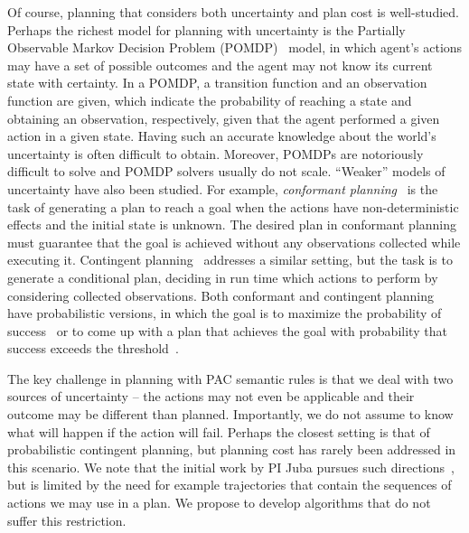 \documentclass[12pt]{article}
\newcommand{\note}[1]{\textbf{\textit{#1}}}
\begin{document}




Of course, planning that considers both uncertainty and plan cost is well-studied. Perhaps the richest model for planning with uncertainty is the Partially Observable Markov Decision Problem (POMDP)~\cite{cassandra1994acting}
model, in which agent's actions may have a set of possible outcomes and the agent may not know its current state with certainty. 
In a POMDP, a transition function and an observation function are given, which indicate the probability of reaching a state and obtaining an observation, respectively, given that the agent performed a given action in a given state. Having such an accurate knowledge about the world's uncertainty is often difficult to obtain. Moreover, POMDPs are notoriously difficult to solve and POMDP solvers usually do not scale. %
``Weaker'' models of uncertainty have also been studied. 
For example, {\em conformant planning}~\cite{hoffmann2006conformant,cimatti2004conformant,cimatti1999conformant} is the task of generating a plan to reach a goal when the actions have non-deterministic effects
and the initial state is unknown. The desired plan in conformant planning must guarantee that the goal is achieved without any observations collected while executing it. Contingent planning~\cite{hoffmann2005contingent,majercik2003contingent} addresses a similar setting, but the task is to generate a conditional plan, deciding in run time which actions to perform by considering collected observations. 
Both conformant and contingent planning have probabilistic versions,
in which the goal is to maximize the probability of success~\cite{blum1999probabilistic,taig2015compilation,markou2016cost} 
or to come up with a plan that achieves the goal with probability that success exceeds the threshold~\cite{kushmerick1995algorithm}.

The key challenge in planning with PAC semantic rules is that
we deal with two sources of uncertainty -- the actions  may not even be applicable and their outcome may be different than planned. Importantly, we do not assume to know what will happen if the action will fail. Perhaps the closest setting is that of probabilistic contingent planning, but planning cost has rarely been addressed in this scenario. We note that the initial work by PI Juba pursues such directions~\cite{juba2016jmlr}, but is limited by the need for example trajectories that contain the sequences of actions we may use in a plan. We propose to develop algorithms that do not suffer this restriction.
\end{document}
